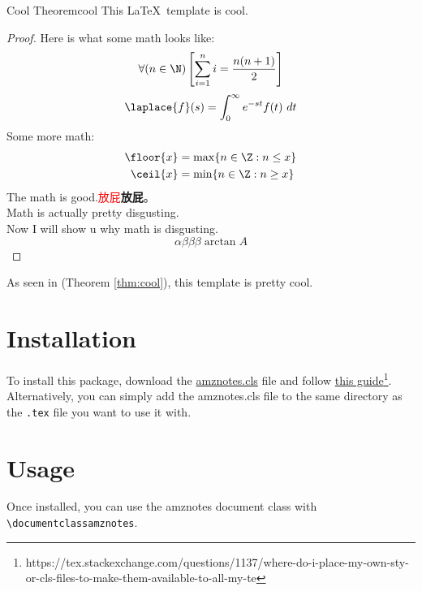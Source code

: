 \ifx\allfiles\undefined

	
	
\else
\fi
\begin{thmbox}{Cool Theorem}{cool}
    This \LaTeX\ template is cool.
    \tcblower
    \begin{proof}
        Here is what some math looks like:
        \[ \forall (n \in \N) \left[ \sum_{i=1}^n i = \frac{n(n+1)}{2} \right] \]
        \[ \laplace \{ f \} (s) = \int_{0}^{\infty} e^{-st} f(t)\ dt \]
        Some more math:
        \begin{align*}
            \floor{x} &= \max \{ n \in \Z : n \leq x \} \\
            \ceil{x} &= \min \{ n \in \Z : n \geq x \}
        \end{align*}
        The math is good.\textcolor{red}{放屁}\textbf{放屁}。\\
        Math is actually pretty disgusting.\\
        Now I will show u why math is disgusting.\\
        \[ \alpha \beta \beta \beta \arctan A \]
    \end{proof}
\end{thmbox}

As seen in  (Theorem \ref{thm:cool}), this template is pretty cool.

\section{Installation}
To install this package, download the \href{https://raw.githubusercontent.com/alexmingzhang/latex-notes-template/main/amznotes.cls}{amznotes.cls} file and follow \href{https://tex.stackexchange.com/questions/1137/where-do-i-place-my-own-sty-or-cls-files-to-make-them-available-to-all-my-te}{this guide}\footnote{https://tex.stackexchange.com/questions/1137/where-do-i-place-my-own-sty-or-cls-files-to-make-them-available-to-all-my-te}. Alternatively, you can simply add the amznotes.cls file to the same directory as the \texttt{.tex} file you want to use it with.

\section{Usage}
Once installed, you can use the amznotes document class with \texttt{\textbackslash documentclass\textbraceleft amznotes\textbraceright}.

